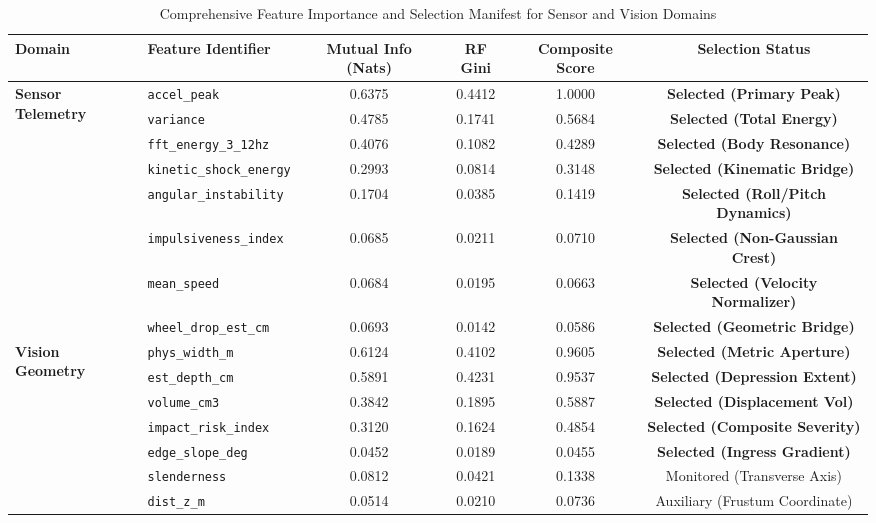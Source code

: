 \begin{table}[h!]
\centering
\small
\caption{Comprehensive Feature Importance and Selection Manifest for Sensor and Vision Domains}
\label{tab:feature_ranking_results}
\begin{tabular}{llcccc}
\hline
\textbf{Domain} & \textbf{Feature Identifier} & \textbf{Mutual Info (Nats)} & \textbf{RF Gini} & \textbf{Composite Score} & \textbf{Selection Status} \\ \hline
\multirow{8}{*}{\textbf{Sensor Telemetry}} 
& \texttt{accel\_peak} & 0.6375 & 0.4412 & 1.0000 & \textbf{Selected (Primary Peak)} \\
& \texttt{variance} & 0.4785 & 0.1741 & 0.5684 & \textbf{Selected (Total Energy)} \\
& \texttt{fft\_energy\_3\_12hz} & 0.4076 & 0.1082 & 0.4289 & \textbf{Selected (Body Resonance)} \\
& \texttt{kinetic\_shock\_energy} & 0.2993 & 0.0814 & 0.3148 & \textbf{Selected (Kinematic Bridge)} \\
& \texttt{angular\_instability} & 0.1704 & 0.0385 & 0.1419 & \textbf{Selected (Roll/Pitch Dynamics)} \\
& \texttt{impulsiveness\_index} & 0.0685 & 0.0211 & 0.0710 & \textbf{Selected (Non-Gaussian Crest)} \\
& \texttt{mean\_speed} & 0.0684 & 0.0195 & 0.0663 & \textbf{Selected (Velocity Normalizer)} \\
& \texttt{wheel\_drop\_est\_cm} & 0.0693 & 0.0142 & 0.0586 & \textbf{Selected (Geometric Bridge)} \\ \hline
\multirow{7}{*}{\textbf{Vision Geometry}} 
& \texttt{phys\_width\_m} & 0.6124 & 0.4102 & 0.9605 & \textbf{Selected (Metric Aperture)} \\
& \texttt{est\_depth\_cm} & 0.5891 & 0.4231 & 0.9537 & \textbf{Selected (Depression Extent)} \\
& \texttt{volume\_cm3} & 0.3842 & 0.1895 & 0.5887 & \textbf{Selected (Displacement Vol)} \\
& \texttt{impact\_risk_index} & 0.3120 & 0.1624 & 0.4854 & \textbf{Selected (Composite Severity)} \\
& \texttt{edge\_slope\_deg} & 0.0452 & 0.0189 & 0.0455 & \textbf{Selected (Ingress Gradient)} \\
& \texttt{slenderness} & 0.0812 & 0.0421 & 0.1338 & Monitored (Transverse Axis) \\
& \texttt{dist\_z\_m} & 0.0514 & 0.0210 & 0.0736 & Auxiliary (Frustum Coordinate) \\ \hline
\end{tabular}
\end{table}

